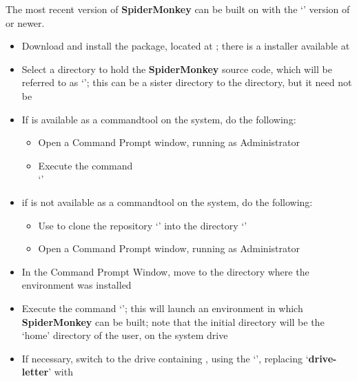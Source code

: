 \tertiaryEnd
{}
The most recent version of \textbf{SpiderMonkey} can be built on \win{} with the
`' version of  or newer.
\begin{itemize}
\item Download and install the  package, located at
;
there is a \win{} installer available at\\
\item\exSp{}Select a directory to hold the \textbf{SpiderMonkey} source code, which will
be referred to as `'; this can be a sister directory to the
 directory, but it need not be
\item\exSp{}If  is available as a command\longDash{}tool on the system, do the
following:
\begin{itemize}
\item Open a Command Prompt window, running as Administrator
\item\exSp{}Execute the command\\
`'
\end{itemize}
\item\exSp{}if  is not available as a command\longDash{}tool on the system, do
the following:
\begin{itemize}
\item\exSp{}Use  to clone the repository
`' into the directory
`'
\item\exSp{}Open a Command Prompt window, running as Administrator
\end{itemize}
\item\exSp{}In the Command Prompt Window, move to the directory where the
 environment was installed
\item\exSp{}Execute the command `'; this will launch
an environment in which \textbf{SpiderMonkey} can be built; note that the initial
directory will be the `home' directory of the user, on the system drive
\item\exSp{}If necessary, switch to the drive containing ,
using the `', replacing `\textbf{drive-letter}' with

\end{itemize}
